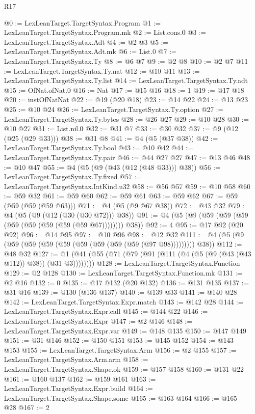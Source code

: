 \begin{lexlean}{R17}
\begin{coremodule}
@0 := LexLeanTarget.TargetSyntax.Program
@1 := LexLeanTarget.TargetSyntax.Program.mk
@2 := List.cons.{0}
@3 := LexLeanTarget.TargetSyntax.Adt
@4 := @2 @3
@5 := LexLeanTarget.TargetSyntax.Adt.mk
@6 := List.{0}
@7 := LexLeanTarget.TargetSyntax.Ty
@8 := @6 @7
@9 := @2 @8
@10 := @2 @7
@11 := LexLeanTarget.TargetSyntax.Ty.nat
@12 := @10 @11
@13 := LexLeanTarget.TargetSyntax.Ty.list
@14 := LexLeanTarget.TargetSyntax.Ty.adt
@15 := OfNat.ofNat.{0}
@16 := Nat
@17 := @15 @16
@18 := 1
@19 := @17 @18
@20 := instOfNatNat
@22 := @19 (@20 @18)
@23 := @14 @22
@24 := @13 @23
@25 := @10 @24
@26 := LexLeanTarget.TargetSyntax.Ty.option
@27 := LexLeanTarget.TargetSyntax.Ty.bytes
@28 := @26 @27
@29 := @10 @28
@30 := @10 @27
@31 := List.nil.{0}
@32 := @31 @7
@33 := @30 @32
@37 := @9 (@12 (@25 (@29 @33)))
@38 := @31 @8
@41 := @4 (@5 (@37 @38))
@42 := LexLeanTarget.TargetSyntax.Ty.bool
@43 := @10 @42
@44 := LexLeanTarget.TargetSyntax.Ty.pair
@46 := @44 @27 @27
@47 := @13 @46
@48 := @10 @47
@55 := @4 (@5 (@9 (@43 (@12 (@48 @33))) @38))
@56 := LexLeanTarget.TargetSyntax.Ty.fixed
@57 := LexLeanTarget.TargetSyntax.IntKind.u32
@58 := @56 @57
@59 := @10 @58
@60 := @59 @32
@61 := @59 @60
@62 := @59 @61
@63 := @59 @62
@67 := @59 (@59 (@59 (@59 @63)))
@71 := @4 (@5 (@9 @67 @38))
@72 := @43 @32
@79 := @4 (@5 (@9 (@12 (@30 (@30 @72))) @38))
@91 := @4 (@5 (@9 (@59 (@59 (@59 (@59 (@59 (@59 (@59 (@59 @67)))))))) @38))
@92 := 4
@95 := @17 @92 (@20 @92)
@96 := @14 @95
@97 := @10 @96
@98 := @12 @32
@111 := @4 (@5 (@9 (@59 (@59 (@59 (@59 (@59 (@59 (@59 (@59 (@97 @98))))))))) @38))
@112 := @48 @32
@127 := @1 (@41 (@55 (@71 (@79 (@91 (@111 (@4 (@5 (@9 (@43 (@43 @112)) @38)) (@31 @3))))))))
@128 := LexLeanTarget.TargetSyntax.Function
@129 := @2 @128
@130 := LexLeanTarget.TargetSyntax.Function.mk
@131 := @2 @16
@132 := 0
@135 := @17 @132 (@20 @132)
@136 := @131 @135
@137 := @31 @16
@139 := @130 (@136 @137)
@140 := @139 @33
@141 := @140 @28
@142 := LexLeanTarget.TargetSyntax.Expr.match
@143 := @142 @28
@144 := LexLeanTarget.TargetSyntax.Expr.call
@145 := @144 @22
@146 := LexLeanTarget.TargetSyntax.Expr
@147 := @2 @146
@148 := LexLeanTarget.TargetSyntax.Expr.var
@149 := @148 @135
@150 := @147 @149
@151 := @31 @146
@152 := @150 @151
@153 := @145 @152
@154 := @143 @153
@155 := LexLeanTarget.TargetSyntax.Arm
@156 := @2 @155
@157 := LexLeanTarget.TargetSyntax.Arm.arm
@158 := LexLeanTarget.TargetSyntax.Shape.ok
@159 := @157 @158
@160 := @131 @22
@161 := @160 @137
@162 := @159 @161
@163 := LexLeanTarget.TargetSyntax.Expr.build
@164 := LexLeanTarget.TargetSyntax.Shape.some
@165 := @163 @164
@166 := @165 @28
@167 := 2

\end{coremodule}
\end{lexlean}
